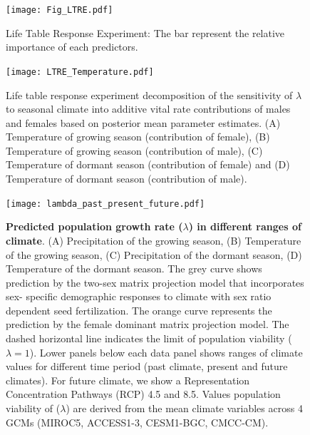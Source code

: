 \documentclass[9pt,twoside,lineno]{pnas-new}
\begin{document}
\begin{figure}
\centering
\texttt{[image: Fig\_LTRE.pdf]}
\caption{Life Table Response Experiment: The bar represent the relative importance of each predictors.}
\label{Sup:LTRE}
\end{figure}
\clearpage

\begin{figure}
\centering
\texttt{[image: LTRE\_Temperature.pdf]}
\caption{Life table response experiment decomposition of the sensitivity of $\lambda$ to seasonal climate into additive vital rate contributions of males and females based on posterior mean parameter estimates.
			(A) Temperature of growing season (contribution of female), (B) Temperature of growing season (contribution of male),  (C) Temperature of dormant season (contribution of female) and (D) Temperature of dormant season (contribution of male).}
		\label{Sup:LTRETemp}
\end{figure}
\clearpage

\begin{figure}
\centering
\texttt{[image: lambda\_past\_present\_future.pdf]}
\caption{\textbf{Predicted population growth rate ($\lambda$) in different ranges of climate}.
			(A) Precipitation of the growing season, (B) Temperature of the growing season, (C) Precipitation of the dormant season, (D) Temperature of the dormant season.
			The grey curve shows prediction by the two-sex matrix projection model that incorporates sex- specific demographic responses to climate with sex ratio dependent seed fertilization.
			The orange curve represents the prediction by the female dominant matrix projection model.
			The dashed horizontal line indicates the limit of population viability ($\lambda = 1$).
			Lower panels below each data panel shows  ranges of climate values for different time period (past climate, present and future climates).
			For future climate, we show a Representation Concentration Pathways (RCP) 4.5 and 8.5. Values population viability of ($\lambda$) are derived from the mean climate variables across 4 GCMs (MIROC5, ACCESS1-3, CESM1-BGC, CMCC-CM).
		}
\label{fig:lambda_LTRE}
\end{figure}
\clearpage
\end{document}

